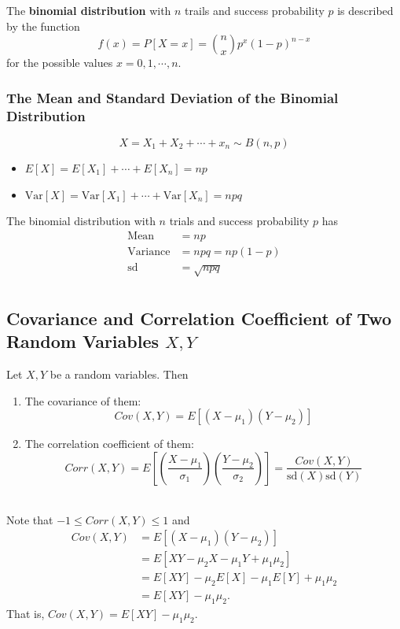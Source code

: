 \documentclass[12pt,a4paper]{article}
\newcommand{\dispsty}{\displaystyle}
\newcommand{\Var}{\text{Var}}
\newcommand{\sd}{\text{sd}}
\newcommand{\Cov}{\textit{Cov}}
\newcommand{\Corr}{\textit{Corr}}
\begin{document}
\begin{tcolorbox}[colback=white]
	The \textbf{binomial distribution} with $n$ trails and success probability $p$ is described by the function \[
	f(x) = P[X=x] = \binom{n}{x}p^x(1-p)^{n-x}
	\] for the possible values $x = 0, 1, \cdots, n$.
\end{tcolorbox}

\subsubsection{The Mean and Standard Deviation of the Binomial Distribution}
\[
X=X_1+X_2+\cdots+x_n\sim B(n,p)
\] \begin{itemize}
	\item \(E[X]=E[X_1] + \cdots + E[X_n] = np \)
	\item \(\Var[X]=\Var[X_1] + \cdots + \Var[X_n] = npq \)
\end{itemize}

\begin{tcolorbox}[colback=white]
	The binomial distribution with $n$ trials and success probability $p$ has \begin{align*}
		\text{Mean} &= np \\
		\text{Variance} &= npq = np(1-p) \\
		\text{sd} &= \sqrt{npq} \\
	\end{align*}
\end{tcolorbox}

\subsection{Covariance and Correlation Coefficient of Two Random Variables $X, Y$}

\begin{tcolorbox}[colback=white]
	Let $X, Y$ be a random variables. Then \begin{enumerate}
		\item The covariance of them: \[\Cov(X,Y)=E[(X-\mu_1)(Y-\mu_2)] \]
		\item The correlation coefficient of them: \[\dispsty\Corr(X,Y)=E\left[\left(\frac{X-\mu_1}{\sigma_1}\right)\left(\frac{Y-\mu_2}{\sigma_2}\right)\right]=\frac{\Cov(X,Y)}{\sd(X)\sd(Y)} \]
	\end{enumerate}
\end{tcolorbox}\ \\
Note that $-1\leq\Corr(X,Y)\leq 1$ and \begin{align*}
	\Cov(X,Y) &= E[(X-\mu_1)(Y-\mu_2) ] \\
	&= E[XY-\mu_2X-\mu_1Y+\mu_1\mu_2] \\
	&= E[XY] - \mu_2E[X] -\mu_1E[Y] +\mu_1\mu_2 \\
	&= E[XY] - \mu_1\mu_2.
\end{align*} That is, $\Cov(X,Y)=E[XY]-\mu_1\mu_2$.
\end{document}

